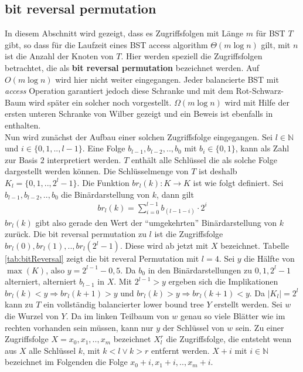 \documentclass[a4paper,12pt]{article}
\begin{document}
\subsection{bit reversal permutation }
In diesem Abschnitt wird gezeigt, dass es Zugriffsfolgen mit Länge $m$ für BST $T$ gibt, so dass für die Laufzeit eines BST access algorithm $\Theta\left(m \log n\right)$ gilt, mit $n$ ist die Anzahl der Knoten von $T$. Hier werden speziell die Zugriffsfolgen betrachtet, die als \textbf{bit reversal permutation} bezeichnet werden. Auf $O\left(m \log n\right)$ wird hier nicht weiter eingegangen. Jeder balancierte BST mit \textit{access} Operation garantiert jedoch diese Schranke und mit dem Rot-Schwarz-Baum wird später ein solcher noch vorgestellt.
 $\Omega\left(m \log n\right)$  wird mit Hilfe der ersten unteren Schranke von Wilber gezeigt und ein Beweis ist ebenfalls in \cite{wilberLowerBounds} enthalten. \\
  Nun wird zunächst der Aufbau einer solchen Zugriffsfolge eingegangen. Sei $l \in \mathbb{N}$ und $i \in \{0,1,..,l-1\}$. Eine Folge  $b_{l-1},b_{l-2},..,b_0$ mit $b_i \in \{0,1\}$, kann als Zahl zur Basis $2$ interpretiert werden. $T$ enthält alle Schlüssel die als solche Folge dargestellt werden können. Die Schlüsselmenge von $T$ ist deshalb $K_l = \{0,1,..,2^l -1\}$. 
  Die Funktion $\mathit{br}_l(k)\colon K \rightarrow K$ ist wie folgt definiert. Sei {$b_{l-1},b_{l-2},..,b_{0}$} die Binärdarstellung von $k$, dann gilt 
\begin{align*}
\mathit{br}_l(k) = \sum_{i = 0}^{l-1} b_{\left(l-1-i\right)} \cdot 2^i
\end{align*}
 $\mathit{br}_l(k)$ gibt also gerade den Wert der \enquote{umgekehrten} Binärdarstellung von $k$ zurück. Die bit reversal permutation zu $l$ ist die Zugriffsfolge\\ ${\mathit{br}_l(0),\mathit{br}_l(1),..,\mathit{br}_l(2^l-1)}$. Diese wird ab jetzt mit $X$ bezeichnet. Tabelle \ref{tab:bitReversal} zeigt die bit reveral Permutation mit $l  = 4$. Sei $y$ die Hälfte von $\max\left(K\right)$, also $y = 2^{l-1} - 0,5$. Da $b_0$ in den Binärdarstellungen zu $0, 1, 2^l-1$ alterniert, alterniert $b_{l-1}$ in $X$. Mit $2^{l-1} > y$ ergeben sich die Implikationen $\mathit{br}_l(k) < y \Rightarrow \mathit{br}_l(k +1) > y$ und $\mathit{br}_l(k) > y \Rightarrow \mathit{br}_l(k +1) < y$. Da $\vert K_l \vert = 2^l$ kann zu $T$ ein vollständig balancierter lower bound tree $Y$ erstellt werden. Sei $w$ die Wurzel von $Y$. Da im linken Teilbaum von $w$ genau so viele Blätter wie im rechten vorhanden sein müssen, kann nur $y$ der Schlüssel von $w$ sein. Zu einer Zugriffsfolge $X = x_0,x_1,..,x_m$ bezeichnet $X^r_l$ die Zugriffsfolge, die entsteht wenn aus $X$ alle Schlüssel $k$, mit $k < l \lor k > r$ entfernt werden. $X + i$ mit $i \in \mathbb{N}$ bezeichnet im Folgenden die Folge $x_0 + i, x_1 + i,.., x_m + i$.\\
 
\end{document}
